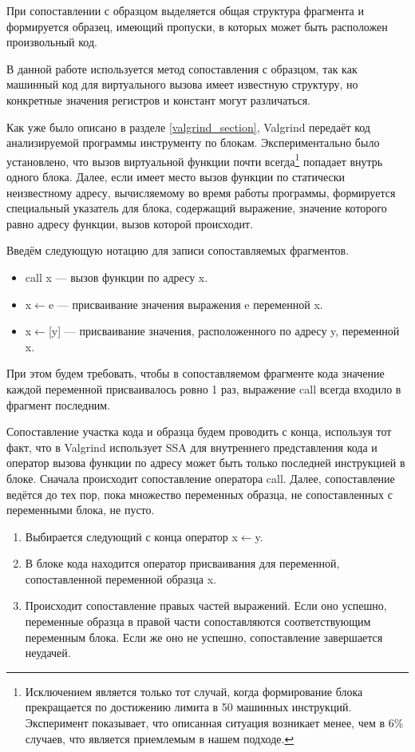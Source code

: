 \documentclass[a4paper,12pt,russian]{article}
\newcommand{\code}[1]{\textsf{#1}}
\begin{document}
При сопоставлении с образцом выделяется общая структура фрагмента и формируется образец, имеющий пропуски, в которых может быть расположен произвольный код.

В данной работе используется метод сопоставления с образцом, так как машинный код для виртуального вызова имеет известную структуру, но конкретные значения регистров и констант могут различаться.

Как уже было описано в разделе \ref{valgrind_section}, \code{Valgrind} передаёт код анализируемой программы инструменту по блокам. Экспериментально было установлено, что вызов виртуальной функции почти всегда\footnote{Исключением является только тот случай, когда формирование блока прекращается по достижению лимита в 50 машинных инструкций. Эксперимент показывает, что описанная ситуация возникает менее, чем в 6\% случаев, что является приемлемым в нашем подходе.} попадает внутрь одного блока.
Далее, если имеет место вызов функции по статически неизвестному адресу, вычисляемому во время работы программы, формируется специальный указатель для блока, содержащий выражение, значение которого равно адресу функции, вызов которой происходит.

Введём следующую нотацию для записи сопоставляемых фрагментов.
\begin{itemize}
    \item \code{call x} --- вызов функции по адресу \code{x}.
    \item \code{x}$\leftarrow$\code{e} --- присваивание значения выражения \code{e} переменной \code{x}.
    \item \code{x}$\leftarrow$\code{[y]} --- присваивание значения, расположенного по адресу \code{y}, переменной \code{x}.
\end{itemize}
При этом будем требовать, чтобы в сопоставляемом фрагменте кода значение каждой переменной присваивалось ровно 1 раз, выражение \code{call} всегда входило в фрагмент последним.

Сопоставление участка кода и образца будем проводить с конца, используя тот факт, что в \code{Valgrind} использует \code{SSA} для внутреннего представления кода и оператор вызова функции по адресу может быть только последней инструкцией в блоке.
Сначала происходит сопоставление оператора \code{call}. Далее, сопоставление ведётся до тех пор, пока множество переменных образца, не сопоставленных с переменными блока, не пусто.

\begin{enumerate}
    \item Выбирается следующий с конца оператор \code{x}$\leftarrow$\code{y}.
    \item В блоке кода находится оператор присваивания для переменной, сопоставленной переменной образца \code{x}.
    \item Происходит сопоставление правых частей выражений. Если оно успешно, переменные образца в правой части сопоставляются соответствующим переменным блока. Если же оно не успешно, сопоставление завершается неудачей.
\end{enumerate}
\end{document}
